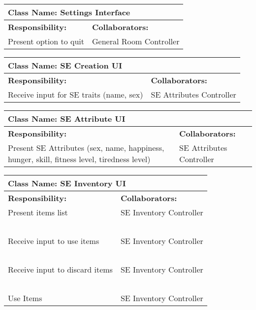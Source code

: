 \documentclass[]{article}
\begin{document}
\begin{table}[H]
    \centering
    \begin{tabular}{|p{5cm}|p{5cm}|}
        \hline
        \multicolumn{2}{|l|}{\textbf{Class Name:} Settings Interface}\\
        \hline
        \textbf{Responsibility:} & \textbf{Collaborators:}\\
        \hline
        Present option to quit & General Room Controller\\
        \hline
    \end{tabular}
\end{table}

\begin{table}[H]
    \centering
    \begin{tabular}{|p{5cm}|p{5cm}|}
        \hline
        \multicolumn{2}{|l|}{\textbf{Class Name:} SE Creation UI}\\
        \hline
        \textbf{Responsibility:} & \textbf{Collaborators:}\\
        \hline
        Receive input for SE traits (name, sex) & SE Attributes Controller\\
        \hline
    \end{tabular}
\end{table}

\begin{table}[H]
    \centering
    \begin{tabular}{|p{5cm}|p{5cm}|}
        \hline
        \multicolumn{2}{|l|}{\textbf{Class Name:} SE Attribute UI}\\
        \hline
        \textbf{Responsibility:} & \textbf{Collaborators:}\\
        \hline
        Present SE Attributes (sex, name, happiness, hunger, skill, fitness level, tiredness level) & SE Attributes Controller\\
        \hline
    \end{tabular}
\end{table}

\begin{table}[H]
    \centering
    \begin{tabular}{|p{5cm}|p{5cm}|}
        \hline
        \multicolumn{2}{|l|}{\textbf{Class Name:} SE Inventory UI}\\
        \hline
        \textbf{Responsibility:} & \textbf{Collaborators:}\\
        \hline
        Present items list & SE Inventory Controller\\
        ~ & ~\\
        Receive input to use items & SE Inventory Controller\\
        ~ & ~\\
        Receive input to discard items & SE Inventory Controller\\
        ~ & ~\\
        Use Items & SE Inventory Controller\\
        \hline
    \end{tabular}
\end{table}
\end{document}
